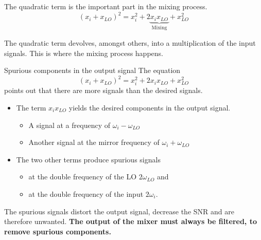 \begin{refsection}
The quadratic term is the important part in the mixing process.
\begin{equation}
	\left(x_{i} + x_{LO}\right)^2 = x_{i}^2 + 2 \underbrace{x_{i} x_{LO}}_{\text{Mixing}} + x_{LO}^2
\end{equation}

The quadratic term devolves, amongst others, into a multiplication of the input signals. This is where the mixing process happens.

\begin{excursus}{Spurious components in the output signal}
	The equation
	\begin{equation*}
		\left(x_{i} + x_{LO}\right)^2 = x_{i}^2 + 2 x_{i} x_{LO} + x_{LO}^2
	\end{equation*}
	points out that there are more signals than the desired signals.
	\begin{itemize}
		\item The term $x_{i} x_{LO}$ yields the desired components in the output signal.
		\begin{itemize}
			\item A signal at a frequency of $\omega_i - \omega_{LO}$
			\item Another signal at the mirror frequency of $\omega_i + \omega_{LO}$
		\end{itemize}
		\item The two other terms produce spurious signals
		\begin{itemize}
			\item at the double frequency of the \ac{LO} $2 \omega_{LO}$ and
			\item at the double frequency of the input $2 \omega_{i}$.
		\end{itemize}
	\end{itemize}
\end{excursus}

The spurious signals distort the output signal, decrease the \ac{SNR} and are therefore unwanted. \textbf{The output of the mixer must always be filtered, to remove spurious components.}


\end{refsection}
